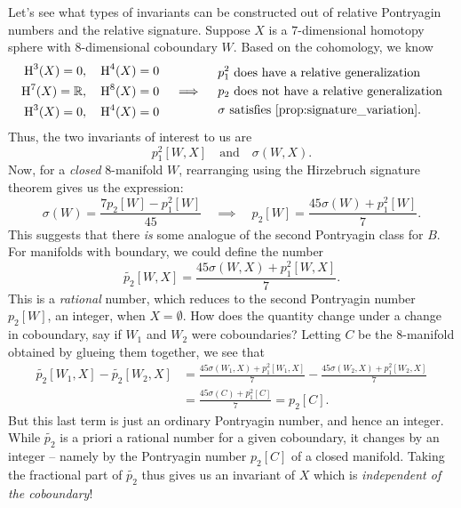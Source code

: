 Let's see what types of invariants can be constructed out of relative Pontryagin numbers and the relative signature. Suppose $X$ is a $7$-dimensional homotopy sphere with $8$-dimensional coboundary $W$. Based on the cohomology, we know
\[
	\begin{aligned}
		\H^3(X)=0,  & \quad \H^4(X)=0 \\
		\H^7(X)=\R, & \quad \H^8(X)=0 \\
		\H^3(X)=0,  & \quad \H^4(X)=0
	\end{aligned}
	\quad\implies\quad
	\begin{aligned}
		 & p_1^2\textrm{ does have a relative generalization}         \\
		 & p_2\textrm{ does not have a relative generalization}       \\
		 & \sigma\textrm{ satisfies \cref{prop:signature_variation}.}
	\end{aligned}
\]
Thus, the two invariants of interest to us are
\[
	p_1^2[W,X]
	\quad\textrm{and}\quad
	\sigma(W, X).
\]
Now, for a \emph{closed} $8$-manifold $W$, rearranging using the Hirzebruch signature theorem gives us the expression:
\begin{equation}\label{eq:7-manifold_rearrangement}
	\sigma(W) = \frac{7p_2[W] - p_1^2[W]}{45}
	\quad\implies\quad
	p_2[W] = \frac{45\sigma(W) + p_1^2[W]}{7}.
\end{equation}
This suggests that there \emph{is} some analogue of the second Pontryagin class for $B$. For manifolds with boundary, we could define the number
\[
	\widetilde{p_2}[W, X] = \frac{45\sigma(W, X) + p_1^2[W, X]}{7}.
\]
This is a \emph{rational} number,
which reduces to the second Pontryagin number $p_2[W]$, an integer, when $X=\emptyset$. How does the quantity change under a change in coboundary, say if $W_1$ and $W_2$ were coboundaries? Letting $C$ be the $8$-manifold obtained by glueing them together, we see that
\[
	\begin{aligned}
		\widetilde{p_2}[W_1,X] - \widetilde{p_2}[W_2,X]
		 & = \frac{45\sigma(W_1,X) + p_1^2[W_1,X]}{7} - \frac{45\sigma(W_2, X) + p_1^2[W_2,X]}{7} \\
		 & =\frac{45\sigma(C) + p_1^2[C]}{7} = p_2[C].
	\end{aligned}
\]
But this last term is just an ordinary Pontryagin number, and hence an integer. While $\widetilde{p_2}$ is a priori a rational number for a given coboundary, it changes by an integer -- namely by the Pontryagin number $p_2[C]$ of a closed manifold.
Taking the fractional part of $\widetilde{p_2}$ thus gives us an invariant of $X$ which is \emph{independent of the coboundary}! 

